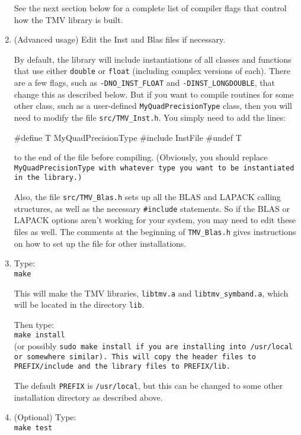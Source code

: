 \begin{enumerate}
See the next section below for a complete list of compiler flags that control how the TMV library is built.

\item
(Advanced usage) Edit the Inst and Blas files if necessary.

By default, the library will include instantiations of all classes and 
functions
that use either \texttt{double} or \texttt{float} (including complex versions of each).  
There are a few flags, such as 
\texttt{-DNO\_INST\_FLOAT} and \texttt{-DINST\_LONGDOUBLE},
that change this as described below.  
But if you want to compile routines for some other class, such as a user-defined
\texttt{MyQuadPrecisionType} class, then you will need to modify the file 
\texttt{src/TMV\_Inst.h}.
You simply need to add the lines:
\begin{tmvcode}
#define T MyQuadPrecisionType
#include InstFile
#undef T
\end{tmvcode}
to the end of the file before compiling.  (Obviously, you should
replace \tt{MyQuadPrecisionType} with whatever
type you want to be instantiated in the library.)

Also, the file \texttt{src/TMV\_Blas.h}
sets up all the BLAS and LAPACK calling structures,
as well as the necessary \texttt{\#include} statements.  
So if the BLAS or LAPACK options aren't working 
for your system, you may need to edit these files as well.
The comments at the beginning of 
\texttt{TMV\_Blas.h} gives instructions on how to set up the file for 
other installations.

\item
Type: \\
\texttt{make}

This will make the TMV libraries, \texttt{libtmv.a} and \texttt{libtmv\_symband.a},
which will be located in the directory \texttt{lib}.

Then type:\\
\texttt{make install}\\
(or possibly \tt{sudo make install} if you are installing into \tt{/usr/local} or somewhere similar).
This will copy the header files to \texttt{PREFIX/include} and the library files to
\texttt{PREFIX/lib}.  

The default \texttt{PREFIX} is \texttt{/usr/local}, but this can be changed
to some other installation directory as described above.

\item
(Optional) Type:\\
\texttt{make test}


\end{enumerate}
